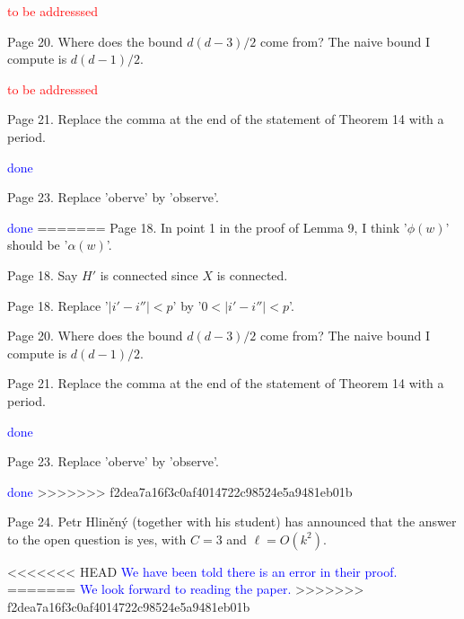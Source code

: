 \documentclass[12pt]{article}
\newcommand{\done}{\textcolor{blue}{done}}
\newcommand{\tba}{\textcolor{red}{to be addresssed}}
\begin{document}
\tba

Page 20.  Where does the bound $d(d-3)/2$ come from?  The naive bound I
compute is $d(d-1)/2$.

\tba

Page 21.  Replace the comma at the end of the statement of Theorem 14
with a period.

\done

Page 23. Replace 'oberve' by 'observe'.

\done
=======
Page 18. In point 1 in the proof of Lemma 9, I think '$\phi(w)$' should
be '$\alpha(w)$'.

Page 18.  Say $H'$ is connected since $X$ is connected.

Page 18.  Replace '$|i'-i''| < p$' by  '$0< |i'-i''| < p$'.

Page 20.  Where does the bound $d(d-3)/2$ come from?  The naive bound I
compute is $d(d-1)/2$.

Page 21.  Replace the comma at the end of the statement of Theorem 14
with a period.

\textcolor{blue}{done}

Page 23. Replace 'oberve' by 'observe'.

\textcolor{blue}{done}
>>>>>>> f2dea7a16f3c0af4014722c98524e5a9481eb01b

Page 24. Petr Hliněný (together with his student) has announced that
the answer to the open question is yes, with $C=3$ and $\ell=O(k^2)$.

<<<<<<< HEAD
\textcolor{blue}{We have been told there is an error in their proof.}
=======
\textcolor{blue}{We look forward to reading the paper.}
>>>>>>> f2dea7a16f3c0af4014722c98524e5a9481eb01b
\end{document}
